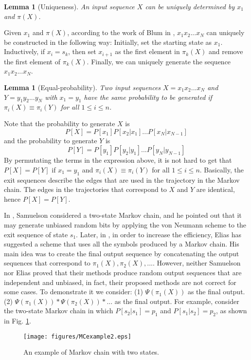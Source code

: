 \documentclass[journal]{IEEEtran}
\newtheorem{Lemma}[Theorem]{Lemma}
\def\pmu{\equiv}
\begin{document}
\begin{Lemma}[Uniqueness]
An input sequence $X$ can be uniquely determined by $x_1$ and $\pi(X)$.\label{lemma_Uniqueness}
\end{Lemma}
\proof
Given $x_1$ and $\pi(X)$, according to the work of Blum in \cite{Blum1986}, $x_1x_2...x_N$ can uniquely
be constructed in the following way: Initially, set the starting state as $x_1$. Inductively, if $x_i=s_k$,
then set $x_{i+1}$ as the first element in $\pi_k(X)$ and remove the first element of $\pi_k(X)$. Finally, we can uniquely generate the sequence $x_1x_2...x_N$.
\hfill\QED

\begin{Lemma}[Equal-probability]  Two input sequences $X=x_1x_2...x_N$ and $Y=y_1y_2...y_N$ with $x_1=y_1$ have the same probability to be generated if $\pi_i(X)\pmu \pi_i(Y)$ for all $1\leq i\leq n$.\label{lemma_equalP}
\end{Lemma}
\proof
Note that the probability to generate $X$ is
$$P[X]=P[x_1]P[x_2|x_1]...P[x_N|x_{N-1}]$$
and the probability to generate $Y$ is
$$P[Y]=P[y_1]P[y_2|y_1]...P[y_N|y_{N-1}]$$
By permutating the terms in the expression above, it is not hard to get that $P[X]=P[Y]$
if $x_1=y_1$  and $\pi_i(X)\pmu \pi_i(Y)$ for all $1\leq i\leq n$. Basically, the exit sequences
describe the edges that are used in the trajectory in the Markov chain. The edges in the trajectories
that correspond to $X$ and $Y$ are identical, hence $P[X]=P[Y]$.
\hfill\QED

In \cite{Samuelson1968}, Samuelson considered a two-state Markov chain, and he pointed out that it may generate unbiased random bits by applying the von Neumann scheme to the exit sequence of state $s_1$. Later, in \cite{Elias1972}, in order to increase the efficiency, Elias has suggested a scheme that uses all the symbols produced by a Markov chain. His main idea was to create the final output sequence by concatenating
the output sequences that correspond to $\pi_1(X),\pi_2(X),...$. However, neither Samuelson nor Elias proved that their methods produce random output sequences that are independent and unbiased, in fact, their proposed methods are not correct for some cases.
To demonstrate it we consider: (1)  $\Psi(\pi_1(X))$ as the final output. (2)  $\Psi(\pi_1(X))*\Psi(\pi_2(X))*...$ as the final output.
For example, consider the two-state Markov chain in which $P[s_2|s_1]=p_1$ and $P[s_1|s_2]=p_2$, as shown in Fig. \ref{fig_MCexample2}.

\begin{figure}[!h]
\centering
\texttt{[image: figures/MCexample2.eps]}
\caption{An example of Markov chain with two states.}
\label{fig_MCexample2}
\end{figure}
\end{document}
